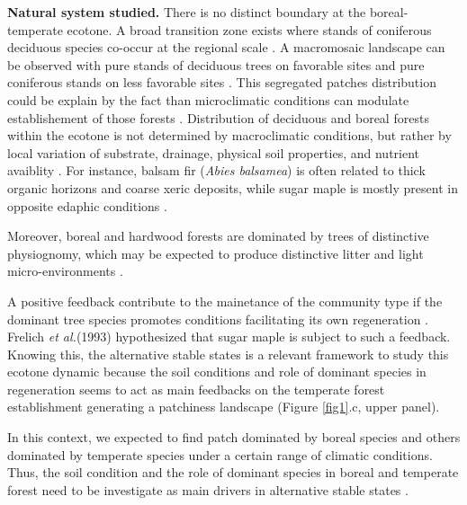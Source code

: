 \textbf{Natural system studied.} There is no distinct boundary at the boreal-
temperate ecotone. A broad transition zone exists where stands of coniferous
deciduous species co-occur at the regional scale \cite{Goldblum2010}. A
macromosaic landscape can be observed with pure stands of deciduous trees on
favorable sites and pure coniferous stands on less favorable sites
\cite{Goldblum2010}. This segregated patches distribution could be explain by
the fact than microclimatic conditions can modulate establishement of those
forests \cite{DeFrenne2013}. Distribution of deciduous and boreal forests
within the ecotone is not determined by macroclimatic conditions, but rather
by local variation of substrate, drainage, physical soil properties, and
nutrient avaiblity \cite{Goldblum2010,Society2014}.  For instance, balsam fir
(\textit{Abies balsamea}) is often related to thick organic horizons and
coarse xeric deposits, while sugar maple is mostly present in opposite edaphic
conditions \cite{Messaoud2007,Kellman2004,Barras1998}.


Moreover, boreal and hardwood forests are dominated by trees of distinctive
physiognomy, which may be expected to produce distinctive litter and light
micro-environments \cite{Barras1998}.


A positive feedback contribute to the mainetance of the community type if the
dominant tree species promotes conditions facilitating its own regeneration
\cite{Barras1998}. Frelich \textit{et al.}(1993) \cite{Society2014}
hypothesized that sugar maple is subject to such a feedback.  Knowing this,
the alternative stable states is a relevant framework to study this ecotone
dynamic because the soil conditions and role of dominant species in
regeneration seems to act as main feedbacks on the temperate forest
establishment generating a patchiness landscape (Figure \ref{fig1}.c, upper
panel).


In this context, we expected to find patch dominated by boreal species and
others dominated by temperate species under a certain range of climatic
conditions. Thus, the soil condition and the role of dominant species in
boreal and temperate forest need to be investigate as main drivers in
alternative stable states
\cite{Kellman2004,Moore2008,DeFrenne2013,Barras1998}.

